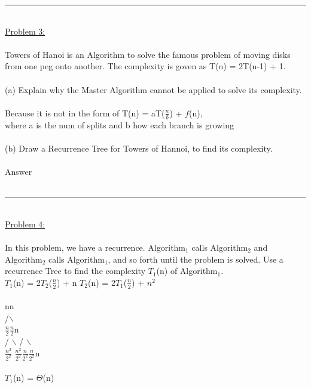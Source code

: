 \documentclass{article}
\begin{document}
    \rule{\textwidth}{0.5pt}\\
    \underline{Problem 3:}\\\\
    Towers of Hanoi is an Algorithm to solve the famous problem of moving disks from one peg onto another. The complexity is goven as T(n) = 2T(n-1) + 1.\\
    \\
    (a) Explain why the Master Algorithm cannot be applied to solve its complexity.\\
    \\
    \indent Because it is not in the form of T(n) = aT($\frac{n}{b}$) + $f$(n),\\
    \indent where a is the num of splits and b how each branch is growing\\
    \\
    (b) Draw a Recurrence Tree for Towers of Hannoi, to find its complexity.\\
    \\
    \indent Answer\\
    \\
    \rule{\textwidth}{0.5pt}\\
    \underline{Problem 4:}\\\\
    In this problem, we have a recurrence. Algorithm$_1$ calls Algorithm$_2$ and Algorithm$_2$ calls Algorithm$_1$, and so forth until the problem is solved. Use a recurrence Tree to find the complexity $T_1$(n) of Algorithm$_1$.\\
    \indent $T_1$(n) = 2$T_2$($\frac{n}{2}$) + n \hspace{5cm} $T_2$(n) = 2$T_1$($\frac{n}{2}$) + $n^2$\\
    \\
    \indent\indent\hspace{3.2cm}n\hspace{4.5cm}n\\
    \indent\hspace{80pt}/\hspace{45pt}$\backslash$\\
    \indent\hspace{77pt}$\frac{n}{2}$\hspace{47pt}$\frac{n}{2}$\hspace{101pt}n\\
    \indent\hspace{70pt} / $\backslash$ \hspace{35pt}\hspace{1pt} / $\backslash$\\
    \indent\hspace{68pt}$\frac{n^2}{2^2}$ $\frac{n^2}{2^2}$\hspace{30pt}$\frac{n}{2^2}$\hspace{6pt}$\frac{n}{2^2}$\hspace{89pt}n\\\\
    \indent $T_1$(n) = $\Theta$(n)
    \\
\end{document}
